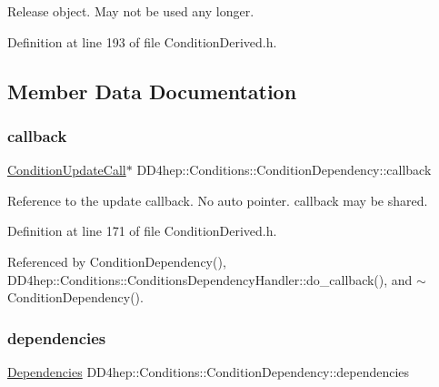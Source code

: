 Release object. May not be used any longer. 



Definition at line 193 of file Condition\+Derived.\+h.



\subsection{Member Data Documentation}
\hypertarget{class_d_d4hep_1_1_conditions_1_1_condition_dependency_aa90b6ad647f576574502b6c023b88372}{}\label{class_d_d4hep_1_1_conditions_1_1_condition_dependency_aa90b6ad647f576574502b6c023b88372} 
\subsubsection{\texorpdfstring{callback}{callback}}
{\footnotesize\ttfamily \hyperlink{class_d_d4hep_1_1_conditions_1_1_condition_update_call}{Condition\+Update\+Call}$\ast$ D\+D4hep\+::\+Conditions\+::\+Condition\+Dependency\+::callback}



Reference to the update callback. No auto pointer. callback may be shared. 



Definition at line 171 of file Condition\+Derived.\+h.



Referenced by Condition\+Dependency(), D\+D4hep\+::\+Conditions\+::\+Conditions\+Dependency\+Handler\+::do\+\_\+callback(), and $\sim$\+Condition\+Dependency().

\hypertarget{class_d_d4hep_1_1_conditions_1_1_condition_dependency_ac90a62165ff00d712a03d48716521c51}{}\label{class_d_d4hep_1_1_conditions_1_1_condition_dependency_ac90a62165ff00d712a03d48716521c51} 
\subsubsection{\texorpdfstring{dependencies}{dependencies}}
{\footnotesize\ttfamily \hyperlink{class_d_d4hep_1_1_conditions_1_1_condition_dependency_af1594501f40e514c5748092b94e4fd84}{Dependencies} D\+D4hep\+::\+Conditions\+::\+Condition\+Dependency\+::dependencies}



